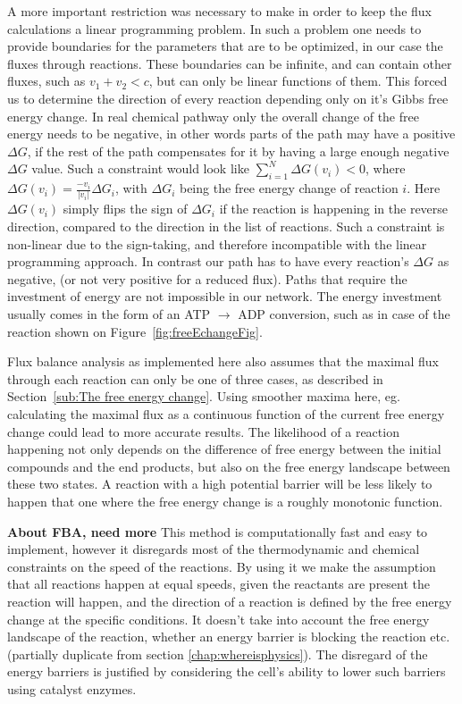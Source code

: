 \documentclass[a4paper,12pt]{article}
\begin{document}
A more important restriction was necessary to make in order to keep the flux calculations a linear programming problem. In such a problem one needs to provide boundaries for the parameters that are to be optimized, in our case the fluxes through reactions. These boundaries can be infinite, and can contain other fluxes, such as $v_1+v_2 < c$, but can only be linear functions of them. This forced us to determine the direction of every reaction depending only on it's Gibbs free energy change. In real chemical pathway only the overall change of the free energy needs to be negative, in other words parts of the path may have a positive $\Delta G$, if the rest of the path compensates for it by having a large enough negative $\Delta G$ value. Such a constraint would look like $\sum_{i=1}^N \Delta G \left( v_i \right)<0$, where $\Delta G \left( v_i \right)=\frac{-v_i}{|v_i|} \Delta G_i$, with $\Delta G_i$ being the free energy change of reaction $i$. Here $\Delta G \left( v_i \right)$ simply flips the sign of $\Delta G_i$ if the reaction is happening in the reverse direction, compared to the direction in the list of reactions. Such a constraint is non-linear due to the sign-taking, and therefore incompatible with the linear programming approach. In contrast our path has to have every reaction's $\Delta G$ as negative, (or not very positive for a reduced flux).
Paths that require the investment of energy are not impossible in our network. The energy investment usually comes in the form of an ATP $\rightarrow$ ADP conversion, such as in case of the reaction shown on Figure~\ref{fig:freeEchangeFig}. 

Flux balance analysis as implemented here also assumes that the maximal flux through each reaction can only be one of three cases, as described in Section~\ref{sub:The free energy change}. Using smoother maxima here, eg. calculating the maximal flux as a continuous function of the current free energy change could lead to more accurate results. The likelihood of a reaction happening not only depends on the difference of free energy between the initial compounds and the end products, but also on the free energy landscape between these two states. A reaction with a high potential barrier will be less likely to happen that one where the free energy change is a roughly monotonic function. 



	\textbf{About FBA, need more}
	This method is computationally fast and easy to implement, however it disregards most of the thermodynamic and chemical constraints on the speed of the reactions. By using it we make the assumption that all reactions happen at equal speeds, given the reactants are present the reaction will happen, and the direction of a reaction is defined by the free energy change at the specific conditions. It doesn't take into account the free energy landscape of the reaction, whether an energy barrier is blocking the reaction etc. (partially duplicate from section \ref{chap:whereisphysics}). The disregard of the energy barriers is justified by considering the cell's ability to lower such barriers using catalyst enzymes.
\end{document}
